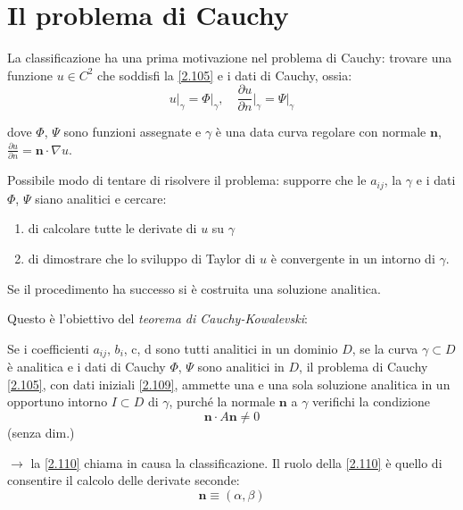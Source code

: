 \documentclass[a4paper,11pt]{report}
\newcommand{\vect}[1]{\boldsymbol{#1}}
\begin{document}
\section{Il problema di Cauchy}
La classificazione ha una prima motivazione nel problema di Cauchy: trovare una funzione $u\in C^2$ che soddisfi la \eqref{2.105} e i dati di Cauchy, ossia:
\begin{equation}
u \big|_{\gamma}=\Phi \big|_{\gamma}, \quad \frac{\partial u}{\partial n} \Big|_{\gamma}=\Psi \big|_{\gamma}
\label{2.109}
\end{equation}

dove $\Phi$, $\Psi$ sono funzioni assegnate e $\gamma$ \`e una data curva regolare con normale $\vect{n}$, $\frac{\partial u}{\partial n}=\vect{n}\cdot \nabla u$.


Possibile modo di tentare di risolvere il problema: supporre che le $a_{ij}$, la $\gamma$ e i dati $\Phi$, $\Psi$ siano analitici e cercare:
\begin{enumerate}[label=(\roman*)]
\item di calcolare tutte le derivate di $u$ su $\gamma$
\item di dimostrare che lo sviluppo di Taylor di $u$ \`e convergente in un intorno di $\gamma$.
\end{enumerate}
Se il procedimento ha successo si \`e costruita una soluzione analitica.

Questo \`e l'obiettivo del \emph{teorema di Cauchy-Kowalevski}: 

Se i coefficienti $a_{ij}$, $b_i$, c, d sono tutti analitici in un dominio $D$, se la curva $\gamma \subset D$ \`e analitica e i dati di Cauchy $\Phi$, $\Psi$ sono analitici in $D$, il problema di Cauchy \eqref{2.105}, con dati iniziali \eqref{2.109}, ammette una e una sola soluzione analitica in un opportuno intorno $I\subset D$ di $\gamma$, purch\'e la normale $\vect{n}$ a $\gamma$ verifichi la condizione 
\begin{equation}
\vect{n}\cdot A \vect{n}\neq 0
\label{2.110}
\end{equation}
(senza dim.)

$\rightarrow$ la \eqref{2.110} chiama in causa la classificazione.
Il ruolo della \eqref{2.110} \`e quello di consentire il calcolo delle derivate seconde:
\[
\vect{n}\equiv (\alpha,\beta)
\]

\end{document}
